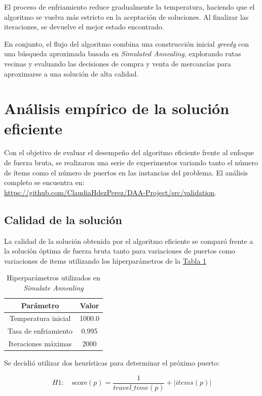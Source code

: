 \documentclass[12pt, a4paper]{article}
\begin{document}
El proceso de enfriamiento reduce gradualmente la temperatura, haciendo que el algoritmo se vuelva más estricto en la aceptación de soluciones. Al finalizar las iteraciones, se devuelve el mejor estado encontrado.

En conjunto, el flujo del algoritmo combina una construcción inicial \textit{greedy} con una búsqueda aproximada basada en \textit{Simulated Annealing}, explorando rutas vecinas y evaluando las decisiones de compra y venta de mercancías para aproximarse a una solución de alta calidad.

\section{Análisis empírico de la solución eficiente}
Con el objetivo de evaluar el desempeño del algoritmo eficiente frente al enfoque de fuerza bruta,
se realizaron una serie de experimentos variando tanto el número de ítems como el número de puertos
en las instancias del problema. 
El análisis completo se encuentra en: \\ \url{https://github.com/ClaudiaHdezPerez/DAA-Project/src/validation}. 

\subsection{Calidad de la solución}
La calidad de la solución obtenida por el algoritmo eficiente se comparó frente a la solución óptima de fuerza bruta tanto para variaciones de puertos como variaciones de items utilizando los hiperparámetros de la \hyperref[fig:tab1]{Tabla 1}

\begin{table}[h]
\centering
\label{fig:tab1}
\begin{tabular}{|c|c|}
\hline
\textbf{Parámetro} & \textbf{Valor} \\ \hline
Temperatura inicial & 1000.0 \\ \hline
Tasa de enfriamiento & 0.995 \\ \hline
Iteraciones máximas & 2000 \\ \hline
\end{tabular}
\caption{Hiperparámetros utilizados en \textit{Simulate Annealing}}
\end{table}

Se decidió utilizar dos heurísticas para determinar el próximo puerto:

\[ H1: \quad
\text{score}(p) = \frac{1}{travel\_time(p)} + \left|items(p)\right|
\]
\end{document}
